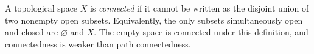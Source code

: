 
A topological space $X$ is \emph{connected} if it cannot be written as the disjoint union of two nonempty open subsets. Equivalently, the only subsets simultaneously open and closed are $\varnothing$ and $X$. The empty space is connected under this definition, and connectedness is weaker than path connectedness.
